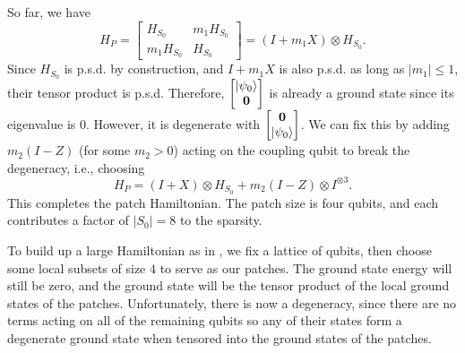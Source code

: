 \documentclass[
  reprint,            %
  amsmath,amssymb,
  aps,
  superscriptaddress, %
  longbibliography
]{revtex4-2}
\theoremstyle{definition}
\begin{document}
So far, we have
\begin{equation}
    H_P
    =
    \begin{bmatrix}
        H_{S_0} & m_1H_{S_0} \\
        m_1H_{S_0} & H_{S_0}
    \end{bmatrix}
    =(I+m_1X)\otimes H_{S_0}.
\end{equation}
Since $H_{S_0}$ is p.s.d. by construction, and $I+m_1X$ is also p.s.d. as long as $|m_1|\le1$, their tensor product is p.s.d.
Therefore, $\begin{bmatrix}|\psi_0\rangle\\\bf{0}\end{bmatrix}$ is already a ground state since its eigenvalue is $0$.
However, it is degenerate with $\begin{bmatrix}\bf{0}\\|\psi_0\rangle\end{bmatrix}$.
We can fix this by adding $m_2(I-Z)$ (for some $m_2>0$) acting on the coupling qubit to break the degeneracy, i.e., choosing
\begin{equation}
    H_P
    =(I+X)\otimes H_{S_0} + m_2(I-Z)\otimes I^{\otimes 3}.
\end{equation}
This completes the patch Hamiltonian.
The patch size is four qubits, and each contributes a factor of $|S_0|=8$ to the sparsity.

To build up a large Hamiltonian as in , we fix a lattice of qubits, then choose some local subsets of size $4$ to serve as our patches.
The ground state energy will still be zero, and the ground state will be the tensor product of the local ground states of the patches.
Unfortunately, there is now a degeneracy, since there are no terms acting on all of the remaining qubits so any of their states form a degenerate ground state when tensored into the ground states of the patches.
\end{document}
